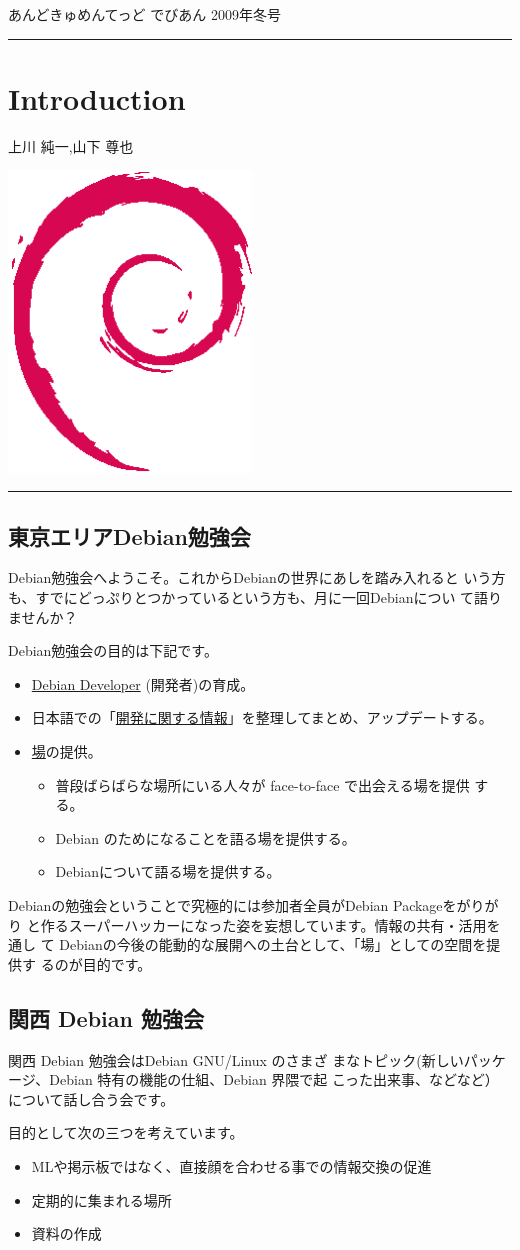 \documentclass[mingoth,a4paper]{jsarticle}
\renewcommand{\dancersection}[2]{%
\newpage
あんどきゅめんてっど でびあん 2009年冬号
%
\vspace{0.1mm}\\
{\color{dancerlightblue}\rule{\hsize}{2mm}}

%
%
\begin{minipage}[t]{0.6\hsize}
\color{dancerdarkblue}
\vspace{1cm}
\section{#1}
\hfill{}#2\\
\end{minipage}
\begin{minipage}[t]{0.4\hsize}
\vspace{-2cm}
\hfill{}\includegraphics[height=8cm]{image200502/openlogo-nd.eps}\\
\vspace{-5cm}
\end{minipage}
%
%
{\color{dancerdarkblue}\rule{0.74\hsize}{2mm}}
%
\vspace{2cm}
}
\begin{document}
\dancersection{Introduction}{上川 純一,山下 尊也} 

\subsection{東京エリアDebian勉強会}

 Debian勉強会へようこそ。これからDebianの世界にあしを踏み入れると
 いう方も、すでにどっぷりとつかっているという方も、月に一回Debianについ
 て語りませんか？

 Debian勉強会の目的は下記です。

\begin{itemize}
 \item \underline{Debian Developer} (開発者)の育成。
 \item 日本語での「\underline{開発に関する情報}」を整理してまとめ、アップデートする。
 \item \underline{場}の提供。
 \begin{itemize}
  \item 普段ばらばらな場所にいる人々が face-to-face で出会える場を提供
	する。
  \item Debian のためになることを語る場を提供する。
  \item Debianについて語る場を提供する。
 \end{itemize}
\end{itemize}		

 Debianの勉強会ということで究極的には参加者全員がDebian Packageをがりがり
 と作るスーパーハッカーになった姿を妄想しています。情報の共有・活用を通し
 て Debianの今後の能動的な展開への土台として、「場」としての空間を提供す
 るのが目的です。

\subsection{関西 Debian 勉強会}

 関西 Debian 勉強会はDebian GNU/Linux のさまざ
 まなトピック(新しいパッケージ、Debian 特有の機能の仕組、Debian 界隈で起
 こった出来事、などなど）について話し合う会です。

 目的として次の三つを考えています。
 \begin{itemize}
  \item MLや掲示板ではなく、直接顔を合わせる事での情報交換の促進
  \item 定期的に集まれる場所
  \item 資料の作成
 \end{itemize}
\end{document}

